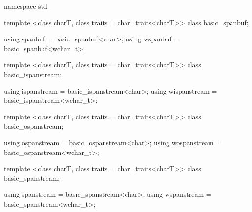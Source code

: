 \documentclass[ebook,11pt,article]{memoir}
\begin{document}
\begin{codeblock}
namespace std {
  template <class charT, class traits = char_traits<charT>>
    class basic_spanbuf;
    
  using spanbuf = basic_spanbuf<char>;
  using wspanbuf = basic_spanbuf<wchar_t>;

  template <class charT, class traits = char_traits<charT>>
    class basic_ispanstream;

  using ispanstream = basic_ispanstream<char>;
  using wispanstream = basic_ispanstream<wchar_t>;

  template <class charT, class traits = char_traits<charT>>
    class basic_ospanstream;

  using ospanstream = basic_ospanstream<char>;
  using wospanstream = basic_ospanstream<wchar_t>;

  template <class charT, class traits = char_traits<charT>>
    class basic_spanstream;

  using spanstream = basic_spanstream<char>;
  using wspanstream = basic_spanstream<wchar_t>;
}
\end{codeblock}
\end{document}
